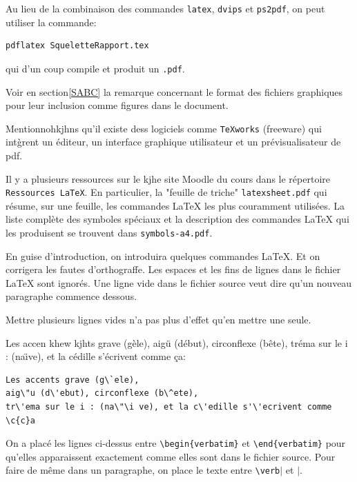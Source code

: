 \documentclass[a4paper,12pt,twoside]{article}
\begin{document}
Au lieu de la combinaison des commandes \verb+latex+, \verb+dvips+ et \verb+ps2pdf+, on peut utiliser la commande:
\begin{verbatim}
pdflatex SqueletteRapport.tex
\end{verbatim}
qui d'un coup compile et produit un \verb+.pdf+.

Voir en section\ref{SABC} la remarque concernant le format des fichiers graphiques pour leur inclusion comme figures dans le document.

Mentionnohkjhns qu'il existe dess logiciels comme \verb+TeXworks+ (freeware) qui int\`grent un \'editeur, un interface graphique utilisateur et un pr\'evisualisateur de pdf.

Il y a plusieurs ressources sur le kjhe site Moodle du cours dans le r\'epertoire \verb+Ressources LaTeX+. En particulier, la "feuille de triche" \verb+latexsheet.pdf+ qui r\'esume, sur une feuille, les commandes \LaTeX{} les plus couramment utilis\'ees. La liste compl\`ete des symboles sp\'eciaux et la description des commandes \LaTeX{} qui les produisent se trouvent dans \verb+symbols-a4.pdf+.

En guise  d'introduction, on introduira quelques commandes \LaTeX{}.
Et on corrigera les fautes d'orthograffe.
Les espaces        et        les         fins                       de    lignes
dans
le
fichier \LaTeX{} sont        ignor\'es. Une ligne vide dans le fichier source veut dire qu'un nouveau paragraphe commence dessous.










Mettre plusieurs lignes vides n'a pas plus d'effet qu'en mettre une seule.



Les accen khew kjhts grave (g\`ele), aig\"u (d\'ebut), circonflexe (b\^ete), tr\'ema
sur le i : (na\"\i ve), et la c\'edille s'\'ecrivent comme \c{c}a:
\begin{verbatim}
Les accents grave (g\`ele),
aig\"u (d\'ebut), circonflexe (b\^ete),
tr\'ema sur le i : (na\"\i ve), et la c\'edille s'\'ecrivent comme
\c{c}a
\end{verbatim}

On a plac\'e les lignes ci-dessus entre \verb|\begin{verbatim}| et
\verb|\end{verbatim}| pour qu'elles apparaissent exactement comme elles
sont dans le fichier source. Pour faire de m\^eme dans un paragraphe,
on place le texte entre \verb|\verb|$|$ et  $|$.
\end{document}

